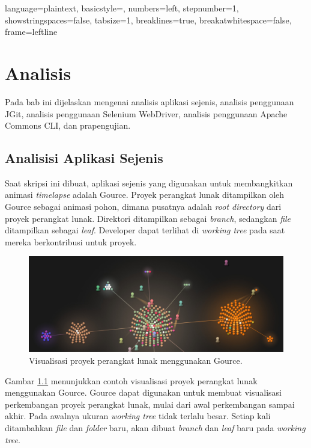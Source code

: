 
\lstset
{ 
    language=plaintext,
    basicstyle=\footnotesize,
    numbers=left,
    stepnumber=1,
    showstringspaces=false,
    tabsize=1,
    breaklines=true,
    breakatwhitespace=false,
    frame=leftline
}

\chapter{Analisis}
\label{chap:analisis}

Pada bab ini dijelaskan mengenai analisis aplikasi sejenis, analisis penggunaan JGit, analisis penggunaan Selenium WebDriver, analisis penggunaan Apache Commons CLI, dan prapengujian. 

\section{Analisisi Aplikasi Sejenis}
\label{sec:analisis_aplikasi_sejenis}
Saat skripsi ini dibuat, aplikasi sejenis yang digunakan untuk membangkitkan animasi \textit{timelapse} adalah Gource.  
Proyek perangkat lunak ditampilkan oleh Gource sebagai animasi pohon, dimana pusatnya adalah \textit{root directory} dari proyek perangkat lunak\cite{Gource}. Direktori ditampilkan sebagai \textit{branch}, sedangkan \textit{file} ditampilkan sebagai \textit{leaf}. Developer dapat terlihat di \textit{working tree} pada saat mereka berkontribusi untuk proyek.

\begin{figure}[H]
	\centering
		\includegraphics[scale=0.2]{Gambar/gource.jpg}
	\caption{Visualisasi proyek perangkat lunak menggunakan Gource.}
	\label{fig:gource}
\end{figure}

Gambar \ref{fig:gource} menunjukkan contoh visualisasi proyek perangkat lunak menggunakan Gource. Gource dapat digunakan untuk membuat visualisasi perkembangan proyek perangkat lunak, mulai dari awal perkembangan sampai akhir. Pada awalnya ukuran \textit{working tree} tidak terlalu besar. Setiap kali ditambahkan \textit{file} dan \textit{folder} baru, akan dibuat \textit{branch} dan \textit{leaf} baru pada \textit{working tree}.

